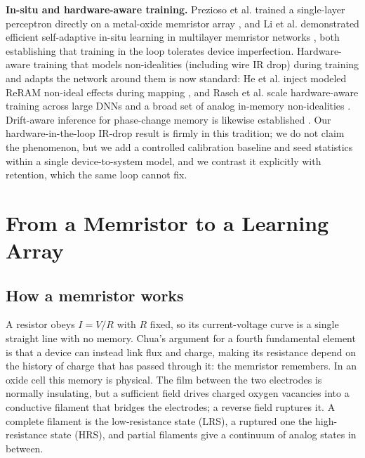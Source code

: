\documentclass[conference]{IEEEtran}
\begin{document}
\textbf{In-situ and hardware-aware training.} Prezioso et al. trained a
single-layer perceptron directly on a metal-oxide memristor array
\cite{prezioso2015}, and Li et al. demonstrated efficient self-adaptive in-situ
learning in multilayer memristor networks \cite{liNComm2018}, both establishing
that training in the loop tolerates device imperfection. Hardware-aware training
that models non-idealities (including wire IR drop) during training and adapts
the network around them is now standard: He et al. inject modeled ReRAM
non-ideal effects during mapping \cite{he2019}, and Rasch et al. scale
hardware-aware training across large DNNs and a broad set of analog in-memory
non-idealities \cite{rasch2023}. Drift-aware inference for phase-change memory is
likewise established \cite{joshi2020}. Our hardware-in-the-loop IR-drop result is
firmly in this tradition; we do not claim the phenomenon, but we add a controlled
calibration baseline and seed statistics within a single device-to-system model,
and we contrast it explicitly with retention, which the same loop cannot fix.

\section{From a Memristor to a Learning Array}
\label{sec:device}
\subsection{How a memristor works}
A resistor obeys $I=V/R$ with $R$ fixed, so its current-voltage curve is a single
straight line with no memory. Chua's argument for a fourth fundamental element
\cite{chua1971} is that a device can instead link flux and charge, making its
resistance depend on the history of charge that has passed through it: the
memristor remembers. In an oxide cell this memory is physical. The film between
the two electrodes is normally insulating, but a sufficient field drives charged
oxygen vacancies into a conductive filament that bridges the electrodes; a reverse
field ruptures it. A complete filament is the low-resistance state (LRS), a
ruptured one the high-resistance state (HRS), and partial filaments give a
continuum of analog states in between.
\end{document}
